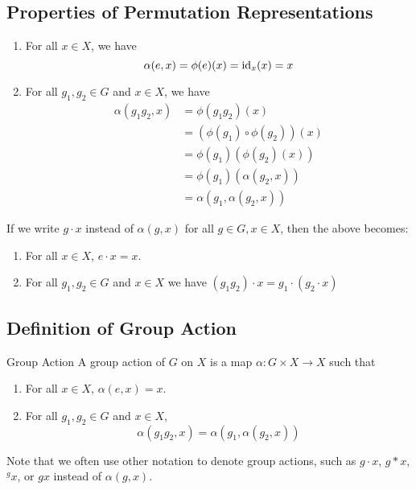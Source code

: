\documentclass{article}
\begin{document}
\subsection{Properties of Permutation Representations}
\begin{enumerate}
    \item For all $x\in X$, we have
    \begin{equation*}
        \alpha(e,x)=\phi(e)(x)=\text{id}_x(x)=x
    \end{equation*}
    \item For all $g_1,g_2\in G$ and $x\in X$, we have
    \begin{align*}
        \alpha(g_1g_2,x) &= \phi(g_1g_2)(x) \\ 
        &= (\phi(g_1)\circ\phi(g_2))(x) \\ 
        &= \phi(g_1)(\phi(g_2)(x)) \\ 
        &= \phi(g_1)(\alpha(g_2,x)) \\
        &=\alpha(g_1,\alpha(g_2,x)) 
    \end{align*}
\end{enumerate}
If we write $g \cdot x$ instead of $\alpha(g,x)$ for all $g\in G, x\in X$, then the above becomes:
\begin{enumerate}
    \item For all $x\in X$, $e\cdot x = x$.
    \item For all $g_1,g_2\in G$ and $x\in X$ we have $(g_1g_2)\cdot x = g_1 \cdot (g_2 \cdot x)$
\end{enumerate}
\subsection{Definition of Group Action}
\begin{definition}{Group Action}
    A group action of $G$ on $X$ is a map $\alpha: G\times X \rightarrow X$ such that
    \begin{enumerate}
        \item For all $x\in X$, $\alpha(e,x)=x$.
        \item For all $g_1,g_2 \in G$ and $x\in X$,
        \begin{equation*}
            \alpha(g_1g_2,x)=\alpha(g_1,\alpha(g_2,x))
        \end{equation*}
    \end{enumerate}
\end{definition}
Note that we often use other notation to denote group actions, such as $g\cdot x$, $g*x$, ${}^gx$, or $gx$ instead of $\alpha(g,x)$.
\end{document}
